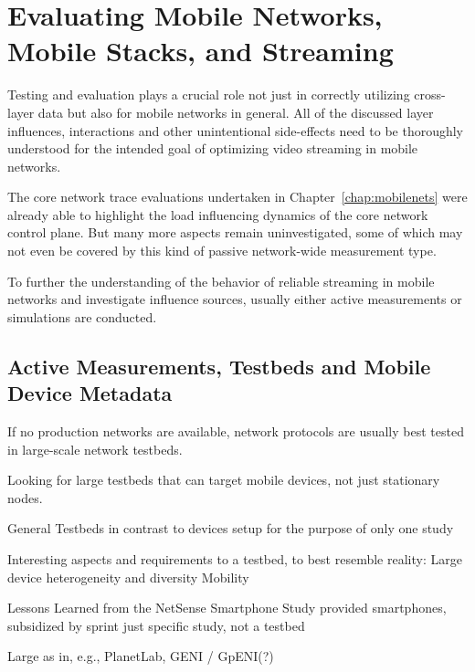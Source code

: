 \section{Evaluating Mobile Networks, Mobile Stacks, and Streaming}
\label{c5:sec:mobilestreaming-measurements}

Testing and evaluation plays a crucial role not just in correctly utilizing cross-layer data but also for mobile networks in general. All of the discussed layer influences, interactions and other unintentional side-effects need to be thoroughly understood for the intended goal of optimizing video streaming in mobile networks.

The core network trace evaluations undertaken in Chapter~\ref{chap:mobilenets} were already able to highlight the load influencing dynamics of the core network control plane. But many more aspects remain uninvestigated, some of which may not even be covered by this kind of passive network-wide measurement type.

To further the understanding of the behavior of reliable streaming in mobile networks and investigate influence sources, usually either active measurements or simulations are conducted.




\subsection{Active Measurements, Testbeds and Mobile Device Metadata}

If no production networks are available, network protocols are usually best tested in large-scale network testbeds.

Looking for large testbeds that can target mobile devices, not just stationary nodes.

General Testbeds in contrast to devices setup for the purpose of only one study

Interesting aspects and requirements to a testbed, to best resemble reality:
Large device heterogeneity and diversity
Mobility

Lessons Learned from the NetSense Smartphone Study \cite{Striegel:2013:LLN:2491159.2491171}
provided smartphones, subsidized by sprint
just specific study, not a testbed

Large as in, e.g., PlanetLab, GENI / GpENI(?)

